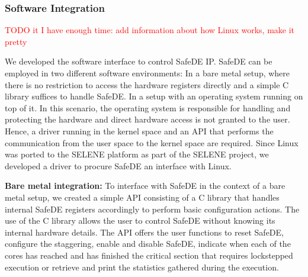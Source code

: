 \subsubsection{Software Integration}
\label{section:software_integration}
\textcolor{red}{TODO it I have enough time: add information about how Linux works, make it pretty}

We developed the software interface to control SafeDE IP. SafeDE can be employed in two different software environments: In a bare metal setup, where there is no restriction to access the hardware registers directly and a simple C library suffices to handle SafeDE. In a setup with an operating system running on top of it. In this scenario, the operating system is responsible for handling and protecting the hardware and direct hardware access is not granted to the user. Hence, a driver running in the kernel space and an API that performs the communication from the user space to the kernel space are required. Since Linux was ported to the SELENE platform as part of the SELENE project, we developed a driver to procure SafeDE an interface with Linux.

\textbf{Bare metal integration:} To interface with SafeDE in the context of a bare metal setup, we created a simple API consisting of a C library that handles internal SafeDE registers accordingly to perform basic configuration actions. The use of the C library allows the user to control SafeDE without knowing its internal hardware details. The API offers the user functions to reset SafeDE, configure the staggering, enable and disable SafeDE, indicate when each of the cores has reached and has finished the critical section that requires lockstepped execution or retrieve and print the statistics gathered during the execution. 


